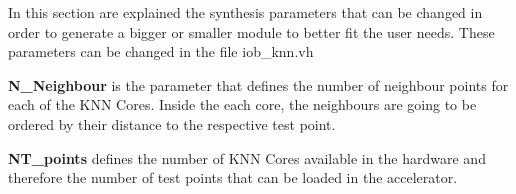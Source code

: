 In this section are explained the synthesis parameters that can be changed in
order to generate a bigger or smaller module to better fit the user needs.
These parameters can be changed in the file iob\_knn.vh

\textbf{N\_Neighbour} is the parameter that defines the number of neighbour points for each of the KNN Cores. Inside the each core, the neighbours are going to be ordered by their distance to the respective test point.

\textbf{NT\_points} defines the number of KNN Cores available in the hardware and therefore the number of test points that can be loaded in the accelerator.
